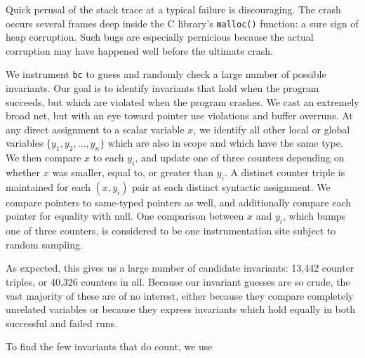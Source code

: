 Quick perusal of the stack trace at a typical failure is discouraging.
The crash occurs several frames deep inside the C library's
\texttt{malloc()} function: a sure sign of heap corruption.  Such bugs
are especially pernicious because the actual corruption may have
happened well before the ultimate crash.  

We instrument \texttt{bc} to guess and randomly check a large number
of possible invariants.  Our goal is to identify invariants that hold
when the program succeeds, but which are violated when the program
crashes.  We cast an extremely broad net, but with an eye toward
pointer use violations and buffer overruns.  At any direct assignment
to a scalar variable $x$, we identify all other local or global
variables $\{ y_1, y_2, \dots, y_n \}$ which are also in scope and
which have the same type.  We then compare $x$ to each $y_i$, and
update one of three counters depending on whether $x$ was smaller,
equal to, or greater than $y_i$.  A distinct counter triple is
maintained for each $(x, y_i)$ pair at each distinct syntactic
assignment.  We compare pointers to same-typed pointers as well, and
additionally compare each pointer for equality with null.  One
comparison between $x$ and $y_i$, which bumps one of three counters,
is considered to be one instrumentation site subject to random
sampling.

As expected, this gives us a large number of candidate invariants:
13,442 counter triples, or 40,326 counters in all.  Because our
invariant guesses are so crude, the vast majority of these are of no
interest, either because they compare completely unrelated variables
or because they express invariants which hold equally in both
successful and failed runs.

To find the few invariants that do count, we use 



